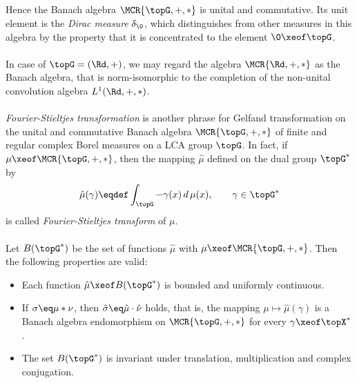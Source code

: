 \documentclass[11pt,twoside]{article}
\begin{document}
\subparagraph{} %
Hence the Banach algebra $\MCR{\topG,+,\ast}$ is unital and commutative.
Its unit element is the \textit{Dirac measure} $\delta_{\0}$,
which distinguishes from other measures in this algebra by the property
that it is concentrated to the element $\0 \xeof \topG$.

\paragraph{}
In case of $\topG=(\Rd,+)$,
we may regard the algebra $\MCR{\Rd,+,\ast}$ as the Banach algebra,
that is norm-isomorphic to the completion
of the non-unital convolution algebra $L^1(\Rd,+,\ast)$.

\paragraph{} %
\textit{Fourier-Stieltjes transformation} is another phrase for
Gelfand transformation on the unital and commutative Banach algebra
$\MCR{\topG,+,*}$ of finite and regular complex Borel measures
on a LCA group $\topG$.
In fact,
if $\mu \xeof \MCR{\topG,+,*}$,
then the mapping $\hat{\mu}$ defined on the dual group $\topG^*$ by
\[
\hat{\mu}(\gamma) \eqdef
\int_{\topG} -\gamma(x) \, d\, \mu(x), \quad \quad \gamma \in \topG^*
\]
is called \textit{Fourier-Stieltjes transform} of  $\mu$.

\paragraph{} %
Let $B(\topG^*)$ be the set of functions $\hat{\mu}$
with $\mu \xeof \MCR{\topG,+,*}$.
Then the following properties are valid:

\begin{itemize}[leftmargin=12pt]
\item[1.]
Each function $\hat{\mu} \xeof B(\topG^*)$ is bounded and uniformly continuous.

\item[2.]
If $\sigma \eq \mu \ast \nu$,
then $\hat{\sigma} \eq \hat{\mu} \cdot \hat{\nu}$ holds,
that is,
the mapping $\mu \mapsto \hat{\mu}(\gamma)$ 
is a Banach algebra endomorphism on $\MCR{\topG,+,*}$
for every $\gamma \xeof \topX^*$.

\item[3.]
The set $B(\topG^*)$ is invariant under translation, multiplication and
complex conjugation.
\end{itemize}
\end{document}
